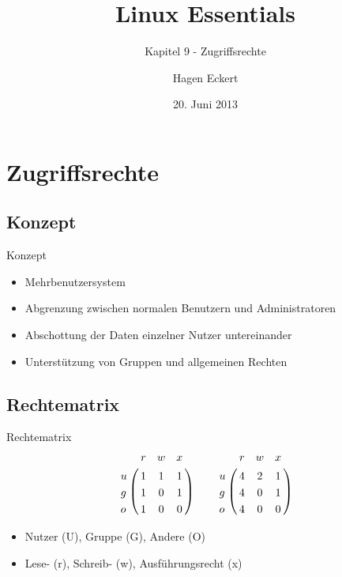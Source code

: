 \documentclass[aspectratio=43]{beamer}
\title[Linux Essentials  - Kapitel 9 - Zugriffsrechte]{Linux Essentials}
\subtitle{Kapitel 9 - Zugriffsrechte}
\author{Hagen Eckert}
\date{20. Juni 2013}
\begin{document}
\logoframe

\frame{\titlepage}

\setcounter{tocdepth}{1}
\section[Gliederung]{}
\frame{\tableofcontents}
\section{Zugriffsrechte}
\subsection{Konzept}
\begin{frame} 
	\begin{block}{Konzept} 
	\begin{itemize}
	\item Mehrbenutzersystem
	\item Abgrenzung zwischen normalen Benutzern und Administratoren
	\item Abschottung der Daten einzelner Nutzer untereinander
	\item Unterstützung von Gruppen und allgemeinen Rechten
	\end{itemize}
	\end{block}


\end{frame}

\subsection{Rechtematrix}

\begin{frame} 
	\begin{block}{Rechtematrix} 
 \begin{align}
\bordermatrix{
 &r	& w   & x      \cr
u & 1 & 1 & 1  \cr
g & 1 & 0 & 1  \cr
o & 1 & 0 & 0  \cr
}\qquad
\bordermatrix{
 &r	& w   & x      \cr
u & 4 & 2 & 1  \cr
g & 4 & 0 & 1  \cr
o & 4 & 0 & 0  \cr
}\nonumber
 \end{align}
	\begin{itemize}
	\item Nutzer (U), Gruppe (G), Andere (O)
	\item Lese- (r), Schreib- (w), Ausführungsrecht (x)
	\end{itemize}
	\end{block}


\end{frame}
\end{document}
